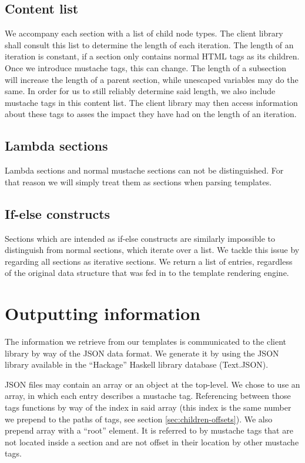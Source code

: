 \subsection{Content list}
\label{sec:content-list}
We accompany each section with a list of child node types. The client library
shall consult this list to determine the length of each iteration.
The length of an iteration is constant, if a section only contains normal
HTML tags as its children. Once we introduce mustache tags, this can change.
The length of a subsection will increase the length of a parent section, while
unescaped variables may do the same.
In order for us to still reliably determine said length, we also include
mustache tags in this content list. The client library may then access
information about these tags to asses the impact they have had on the length of
an iteration.

\subsection{Lambda sections}
Lambda sections and normal mustache sections can not be distinguished.
For that reason we will simply treat them as sections when parsing templates.

\subsection{If-else constructs}
Sections which are intended as if-else constructs are similarly impossible to
distinguish from normal sections, which iterate over a list. We tackle this
issue by regarding all sections as iterative sections. We return a list of
entries, regardless of the original data structure that was fed in to the
template rendering engine.

\section{Outputting information}
\label{sec:output}
The information we retrieve from our templates is communicated to the client
library by way of the JSON data format. We generate it by using the JSON library
available in the ``Hackage'' Haskell library database (Text.JSON).

JSON files may contain an array or an object at the top-level. We chose to use
an array, in which each entry describes a mustache tag. Referencing between
those tags functions by way of the index in said array (this index is the same
number we prepend to the paths of tags, see section \ref{sec:children-offsets}).
We also prepend array with a ``root'' element. It is referred to by mustache
tags that are not located inside a section and are not offset in their location
by other mustache tags.


